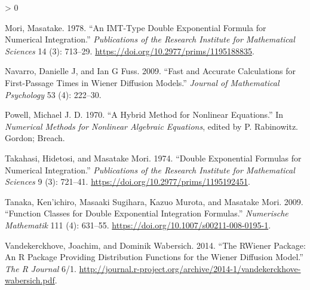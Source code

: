 \documentclass[
  10pt,
]{book}
\let\cleardoublepage\clearpage
\newlength{\cslhangindent}
\newenvironment{CSLReferences}[2] %
 {%
  \setlength{\parindent}{0pt}
  \ifodd #1 \everypar{\setlength{\hangindent}{\cslhangindent}}\ignorespaces\fi
  \ifnum #2 > 0
  \setlength{\parskip}{#2\baselineskip}
  \fi
 }%
 {}
\begin{document}
\begin{CSLReferences}{1}{0}
\leavevmode\hypertarget{ref-Mori:1978}{}%
Mori, Masatake. 1978. {``An IMT-Type Double Exponential Formula for Numerical Integration.''} \emph{Publications of the Research Institute for Mathematical Sciences} 14 (3): 713--29. \url{https://doi.org/10.2977/prims/1195188835}.

\leavevmode\hypertarget{ref-NavarroFuss2009}{}%
Navarro, Danielle J, and Ian G Fuss. 2009. {``Fast and Accurate Calculations for First-Passage Times in {W}iener Diffusion Models.''} \emph{Journal of Mathematical Psychology} 53 (4): 222--30.

\leavevmode\hypertarget{ref-Powell:1970}{}%
Powell, Michael J. D. 1970. {``A Hybrid Method for Nonlinear Equations.''} In \emph{Numerical Methods for Nonlinear Algebraic Equations}, edited by P. Rabinowitz. Gordon; Breach.

\leavevmode\hypertarget{ref-Takahasi:1974}{}%
Takahasi, Hidetosi, and Masatake Mori. 1974. {``Double Exponential Formulas for Numerical Integration.''} \emph{Publications of the Research Institute for Mathematical Sciences} 9 (3): 721--41. \url{https://doi.org/10.2977/prims/1195192451}.

\leavevmode\hypertarget{ref-Tanaka:2009}{}%
Tanaka, Ken'ichiro, Masaaki Sugihara, Kazuo Murota, and Masatake Mori. 2009. {``Function Classes for Double Exponential Integration Formulas.''} \emph{Numerische Mathematik} 111 (4): 631--55. \url{https://doi.org/10.1007/s00211-008-0195-1}.

\leavevmode\hypertarget{ref-Vandekerckhove-Wabersich:2014}{}%
Vandekerckhove, Joachim, and Dominik Wabersich. 2014. {``The {R}{W}iener Package: An {R} Package Providing Distribution Functions for the {W}iener Diffusion Model.''} \emph{The R Journal} 6/1. \url{http://journal.r-project.org/archive/2014-1/vandekerckhove-wabersich.pdf}.

\end{CSLReferences}

{\footnotesize
\cleardoublepage
{}
{}
\printindex
}

\backmatter
\end{document}
